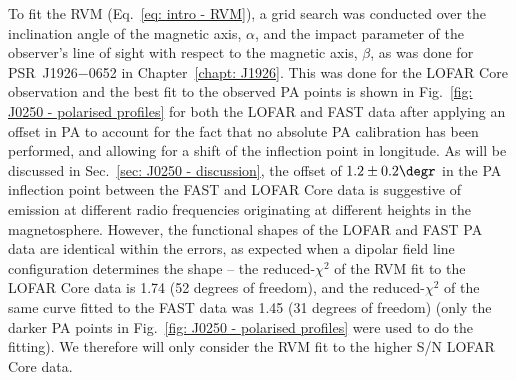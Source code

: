 To fit the RVM (Eq.~\eqref{eq: intro - RVM}), a grid search was conducted over the inclination angle of the magnetic axis, $\alpha$, and the impact parameter of the observer's line of sight with respect to the magnetic axis, $\beta$, as was done for PSR~J1926$-$0652 in Chapter~\ref{chapt: J1926}. This was done for the LOFAR Core observation and the best fit to the observed PA points is shown in Fig.~\ref{fig: J0250 - polarised profiles} for both the LOFAR and FAST data after applying an offset in PA to account for the fact that no absolute PA calibration has been performed, and allowing for a shift of the inflection point in longitude. As will be discussed in Sec.~\ref{sec: J0250 - discussion}, the offset of $1.2\pm0.2\degr$ in the PA inflection point between the FAST and LOFAR Core data is suggestive of emission at different radio frequencies originating at different heights in the magnetosphere. However, the functional shapes of the LOFAR and FAST PA data are identical within the errors, as expected when a dipolar field line configuration determines the shape -- the reduced-$\chi^2$ of the RVM fit to the LOFAR Core data is 1.74 (52 degrees of freedom), and the reduced-$\chi^2$ of the same curve fitted to the FAST data was 1.45 (31 degrees of freedom) (only the darker PA points in Fig.~\ref{fig: J0250 - polarised profiles} were used to do the fitting). We therefore will only consider the RVM fit to the higher S/N LOFAR Core data. 

